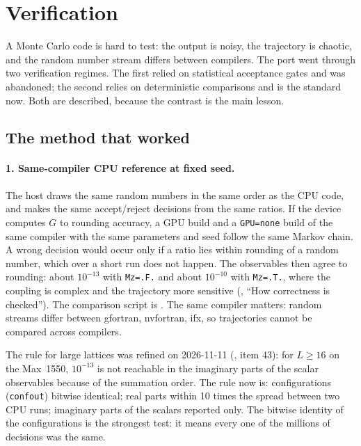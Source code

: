 \section{Verification}
\label{sec:verif}

A Monte Carlo code is hard to test: the output is noisy, the trajectory is chaotic, and the random number stream differs between compilers. The port went through two verification regimes. The first relied on statistical acceptance gates and was abandoned; the second relies on deterministic comparisons and is the standard now. Both are described, because the contrast is the main lesson.

\subsection{The method that worked}

\paragraph{1. Same-compiler CPU reference at fixed seed.} The host draws the same random numbers in the same order as the CPU code, and makes the same accept/reject decisions from the same ratios. If the device computes $G$ to rounding accuracy, a GPU build and a \texttt{GPU=none} build of the same compiler with the same parameters and seed follow the same Markov chain. A wrong decision would occur only if a ratio lies within rounding of a random number, which over a short run does not happen. The observables then agree to rounding: about $10^{-13}$ with \texttt{Mz=.F.} and about $10^{-10}$ with \texttt{Mz=.T.}, where the coupling is complex and the trajectory more sensitive (, ``How correctness is checked''). %
The comparison script is . The same compiler matters: random streams differ between gfortran, nvfortran, ifx, so trajectories cannot be compared across compilers.

The rule for large lattices was refined on 2026-11-11 (, item 43): for $L\ge16$ on the Max~1550, $10^{-13}$ is not reachable in the imaginary parts of the scalar observables because of the summation order. The rule now is: configurations (\texttt{confout}) bitwise identical; real parts within 10 times the spread between two CPU runs; imaginary parts of the scalars reported only. The bitwise identity of the configurations is the strongest test: it means every one of the millions of decisions was the same.

